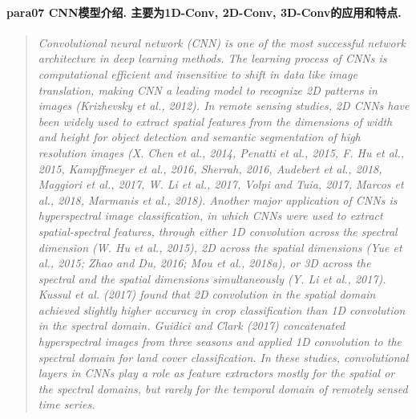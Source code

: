 \paragraph*{para07
    \textcolor[RGB]{17, 205, 29}{CNN模型介绍. 主要为1D-Conv, 2D-Conv, 3D-Conv的应用和特点.}}
\begin{quotation}
    \itshape
    Convolutional neural network (CNN) is one of the most successful network architecture in deep learning methods. The learning process of CNNs is computational efficient and insensitive to shift in data like image translation, making CNN a leading model to recognize 2D patterns in images (Krizhevsky et al., 2012). In remote sensing studies, 2D CNNs have been widely used to extract spatial features from the dimensions of width and height for object detection and semantic segmentation of high resolution images (X. Chen et al., 2014, Penatti et al., 2015, F. Hu et al., 2015, Kampffmeyer et al., 2016, Sherrah, 2016, Audebert et al., 2018, Maggiori et al., 2017, W. Li et al., 2017, Volpi and Tuia, 2017, Marcos et al., 2018, Marmanis et al., 2018). Another major application of CNNs is hyperspectral image classification, in which CNNs were used to extract spatial-spectral features, through either 1D convolution across the spectral dimension (W. Hu et al., 2015), 2D across the spatial dimensions (Yue et al., 2015; Zhao and Du, 2016; Mou et al., 2018a), or 3D across the spectral and the spatial dimensions simultaneously (Y. Li et al., 2017). Kussul et al. (2017) found that 2D convolution in the spatial domain achieved slightly higher accuracy in crop classification than 1D convolution in the spectral domain. Guidici and Clark (2017) concatenated hyperspectral images from three seasons and applied 1D convolution to the spectral domain for land cover classification. In these studies, convolutional layers in CNNs play a role as feature extractors mostly for the spatial or the spectral domains, but rarely for the temporal domain of remotely sensed time series.
\end{quotation}

